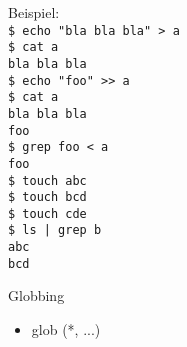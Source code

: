     \begin{frame}
      Beispiel:\\
      \texttt{\$ echo "bla bla bla" > a\\
              \$ cat a\\
              bla bla bla\\
              \$ echo "foo" >> a\\
              \$ cat a\\
              bla bla bla\\
              foo\\
              \$ grep foo < a\\
              foo\\
              \$ touch abc\\
              \$ touch bcd\\
              \$ touch cde\\
              \$ ls | grep b\\
              abc\\
              bcd}
    \end{frame}

    \begin{frame}{Globbing}
      \begin{itemize}
        \item glob (*, ...)
      \end{itemize}
    \end{frame}
